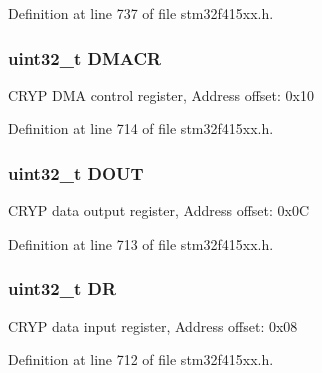 Definition at line 737 of file stm32f415xx.\+h.

\subsubsection[{\texorpdfstring{D\+M\+A\+CR}{DMACR}}]{ uint32\+\_\+t D\+M\+A\+CR}\hypertarget{struct_c_r_y_p___type_def_a082219a924d748e9c6092582aec06226}{}\label{struct_c_r_y_p___type_def_a082219a924d748e9c6092582aec06226}
C\+R\+YP D\+MA control register, Address offset\+: 0x10 

Definition at line 714 of file stm32f415xx.\+h.

\subsubsection[{\texorpdfstring{D\+O\+UT}{DOUT}}]{ uint32\+\_\+t D\+O\+UT}\hypertarget{struct_c_r_y_p___type_def_ab8ba768d1dac54a845084bd07f4ef2b9}{}\label{struct_c_r_y_p___type_def_ab8ba768d1dac54a845084bd07f4ef2b9}
C\+R\+YP data output register, Address offset\+: 0x0C 

Definition at line 713 of file stm32f415xx.\+h.

\subsubsection[{\texorpdfstring{DR}{DR}}]{ uint32\+\_\+t DR}\hypertarget{struct_c_r_y_p___type_def_a3df0d8dfcd1ec958659ffe21eb64fa94}{}\label{struct_c_r_y_p___type_def_a3df0d8dfcd1ec958659ffe21eb64fa94}
C\+R\+YP data input register, Address offset\+: 0x08 

Definition at line 712 of file stm32f415xx.\+h.

